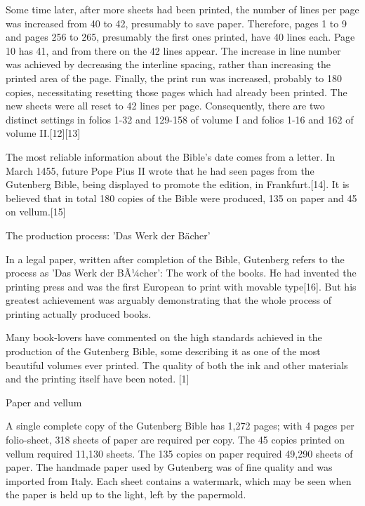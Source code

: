 {{Some time later, after more sheets had been printed, the number of lines per page was increased from 40 to 42, presumably to save paper. Therefore, pages 1 to 9 and pages 256 to 265, presumably the first ones printed, have 40 lines each. Page 10 has 41, and from there on the 42 lines appear. The increase in line number was achieved by decreasing the interline spacing, rather than increasing the printed area of the page.
Finally, the print run was increased, probably to 180 copies, necessitating resetting those pages which had already been printed. The new sheets were all reset to 42 lines per page. Consequently, there are two distinct settings in folios 1-32 and 129-158 of volume I and folios 1-16 and 162 of volume II.[12][13]

The most reliable information about the Bible's date comes from a letter. In March 1455, future Pope Pius II wrote that he had seen pages from the Gutenberg Bible, being displayed to promote the edition, in Frankfurt.[14].
It is believed that in total 180 copies of the Bible were produced, 135 on paper and 45 on vellum.[15]

The production process: 'Das Werk der B\"acher'

In a legal paper, written after completion of the Bible, Gutenberg refers to the process as 'Das Werk der BÃ¼cher': The work of the books. He had invented the printing press and was the first European to print with movable type[16]. But his greatest achievement was arguably demonstrating that the whole process of printing actually produced books.

Many book-lovers have commented on the high standards achieved in the production of the Gutenberg Bible, some describing it as one of the most beautiful volumes ever printed. The quality of both the ink and other materials and the printing itself have been noted. [1]

Paper and vellum

A single complete copy of the Gutenberg Bible has 1,272 pages; with 4 pages per folio-sheet, 318 sheets of paper are required per copy. The 45 copies printed on vellum required 11,130 sheets. The 135 copies on paper required 49,290 sheets of paper. The handmade paper used by Gutenberg was of fine quality and was imported from Italy. Each sheet contains a watermark, which may be seen when the paper is held up to the light, left by the papermold.

}}
